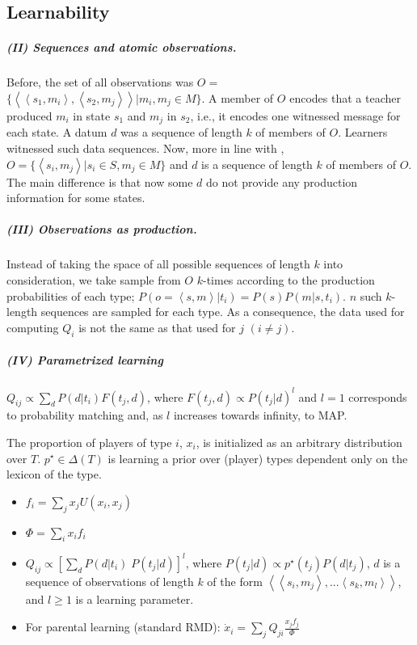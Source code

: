 \documentclass[a4paper]{article}
\newcommand{\tuple}[1]{\ensuremath{\left\langle #1 \right\rangle}}
\begin{document}
\subsection{Learnability}
\subparagraph{(II) Sequences and atomic observations.} Before, the set of all observations was $O =$\linebreak  $\{\tuple{\tuple{s_1,m_i},\tuple{s_2,m_j}} | m_i, m_j \in M\}$. A member of $O$ encodes that a teacher produced $m_i$ in state $s_1$ and $m_j$ in $s_2$, i.e., it encodes one witnessed message for each state. A datum $d$ was a sequence of length $k$ of members of $O$. Learners witnessed such data sequences. Now, more in line with \citet{griffiths+kalish:2007}, $O = \{\tuple{s_i,m_j} | s_i \in S, m_j \in M\}$ and $d$ is a sequence of length $k$ of members of $O$. The main difference is that now some $d$ do not provide any production information for some states.

\subparagraph{(III) Observations as production.} Instead of taking the space of all possible sequences of length $k$ into consideration, we take sample from $O$ $k$-times according to the production probabilities of each type; $P(o = \tuple{s,m} | t_i) = P(s) P(m|s,t_i)$. $n$ such $k$-length sequences are sampled for each type. As a consequence, the data used for computing $Q_i$ is not the same as that used for $j$ $(i \neq j)$.

\subparagraph{(IV) Parametrized learning} $Q_{ij} \propto \sum_d P(d|t_i) F(t_j,d)$, where $F(t_j,d) \propto P(t_j|d)^l$ and $l =1$ corresponds to probability matching and, as $l$ increases towards infinity, to MAP.  	      

The proportion of players of type $i$, $x_i$, is initialized as an arbitrary distribution over $T$. $p^\star \in \Delta(T)$ is learning a prior over (player) types dependent only on the lexicon of the type. 
\begin{itemize}
    \item $f_i = \sum_j x_j U(x_i,x_j)$
    \item $\Phi = \sum_i x_i f_i$
    \item $Q_{ij} \propto [\sum_d P(d|t_i) \; P(t_j|d)]^l$, where $P(t_j|d) \propto p^\star(t_j) P(d|t_j)$, $d$ is a sequence of observations of length $k$ of the form \tuple{\tuple{s_i,m_j}, ... \tuple{s_k, m_l}}, and $l \geq 1$ is a learning parameter.
	\item For parental learning (standard RMD): $\dot x_i = \sum_j Q_{ji} \frac{x_j f_j}{\Phi}$
\end{itemize}
\end{document}
